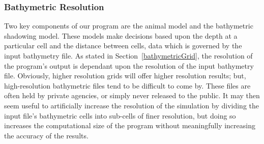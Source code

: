 \subsubsection{Bathymetric Resolution}
Two key components of our program are the animal model and the bathymetric shadowing model.  These models make decisions based upon the depth at a particular cell and the distance between cells, data which is governed by the input bathymetry file.  As stated in Section~\ref{bathymetricGrid}, the resolution of the program's output is dependant upon the resolution of the input bathymetry file.  Obviously, higher resolution grids will offer higher resolution results; but, high-resolution bathymetric files tend to be difficult to come by.  These files are often held by private agencies, or simply never released to the public.  It may then seem useful to artificially increase the resolution of the simulation by dividing the input file's bathymetric cells into sub-cells of finer resolution, but doing so increases the computational size of the program without meaningfully increasing the accuracy of the results.    
 
